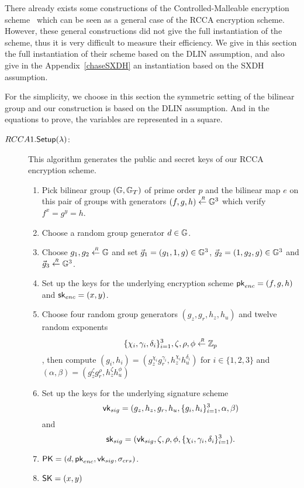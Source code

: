 There already exists some constructions of the Controlled-Malleable encryption scheme~\cite{DBLP:conf/eurocrypt/ChaseKLM12} which can be seen as a general case of the RCCA encryption scheme.
However, these general constructions did not give the full instantiation of the scheme, thus it is very difficult to measure their efficiency.
We give in this section the full instantiation of their scheme based on the DLIN assumption, and also give in the Appendix~\ref{chaseSXDH} an instantiation based on the SXDH assumption. 

For the simplicity, we choose in this section the symmetric setting of the bilinear group and our construction is based on the DLIN assumption.
And in the equations to prove, the variables are represented in a square.

\begin{description}
\item[\boldmath$RCCA1.{\mathsf{Setup}}(\lambda)$:] This algorithm generates the public and secret keys of our RCCA encryption scheme.
  \begin{enumerate}
  \item Pick bilinear group $(\mathbb{G}, \mathbb{G}_T)$ of prime order $p$ and the bilinear map $e$ on this pair of groups with generators $(f,g,h) \stackrel{{\scriptscriptstyle \mkern4mu R}}{\gets} \mathbb{G}^3$ which verify $f^x = g^y = h$.
  \item Choose a random group generator $d \in \mathbb{G}$.
  \item Choose $g_1,g_2 \stackrel{{\scriptscriptstyle \mkern4mu R}}{\gets} \mathbb{G}$ and set $\vec{g}_1 = (g_1,1,g) \in \mathbb{G}^3$, $\vec{g}_2 = (1,g_2,g) \in \mathbb{G}^3$ and $\vec{g}_3 \stackrel{{\scriptscriptstyle \mkern4mu R}}{\gets} \mathbb{G}^3$.
  \item Set up the keys for the underlying encryption scheme $\mathsf{pk}_{enc} = (f,g,h)$ and $\mathsf{sk}_{enc} = (x,y)$.
  \item Choose four random group generators $(g_z, g_r, h_z, h_u)$ and twelve random exponents
    $$\{\chi_i, \gamma_i, \delta_i\}_{i = 1}^3, \zeta, \rho, \phi \stackrel{{\scriptscriptstyle \mkern4mu R}}{\gets} \mathbb{Z}_p$$,
    then compute $(g_i,h_i) = (g_z^{\chi_i}g_r^{\gamma_i}, h_z^{\chi_i}h_u^{\delta_i})$ for $ i \in \{1,2,3\}$ and $(\alpha,\beta) = (g_z^\zeta g_r^\rho, h_z^\zeta h_u^\phi)$
  \item Set up the keys for the underlying signature scheme
    $$\mathsf{vk}_{sig} = (g_z, h_z, g_r, h_u, \{g_i, h_i\}_{i = 1}^3, \alpha ,\beta)$$
    and
    $$\mathsf{sk}_{sig} = (\mathsf{vk}_{sig}, \zeta, \rho, \phi, \{\chi_i, \gamma_i, \delta_i\}_{i = 1}^3).$$
  \item $\mathsf{PK} = (d,\mathsf{pk}_{enc}, \mathsf{vk}_{sig}, \sigma_{crs})$.
  \item $\mathsf{SK} = (x, y)$
  \end{enumerate}


\end{description}
